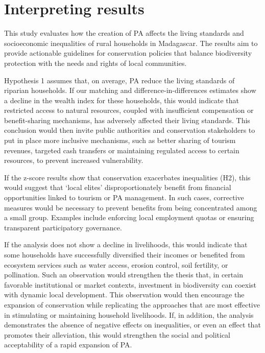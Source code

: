 \documentclass[
]{article}
\begin{document}
\section{Interpreting results}\label{interpreting-results}

This study evaluates how the creation of PA affects the living standards
and socioeconomic inequalities of rural households in Madagascar. The
results aim to provide actionable guidelines for conservation policies
that balance biodiversity protection with the needs and rights of local
communities.

Hypothesis 1 assumes that, on average, PA reduce the living standards of
riparian households. If our matching and difference-in-differences
estimates show a decline in the wealth index for these households, this
would indicate that restricted access to natural resources, coupled with
insufficient compensation or benefit-sharing mechanisms, has adversely
affected their living standards. This conclusion would then invite
public authorities and conservation stakeholders to put in place more
inclusive mechanisms, such as better sharing of tourism revenues,
targeted cash transfers or maintaining regulated access to certain
resources, to prevent increased vulnerability.

If the z-score results show that conservation exacerbates inequalities
(H2), this would suggest that `local elites' disproportionately benefit
from financial opportunities linked to tourism or PA management. In such
cases, corrective measures would be necessary to prevent benefits from
being concentrated among a small group. Examples include enforcing local
employment quotas or ensuring transparent participatory governance.

If the analysis does not show a decline in livelihoods, this would
indicate that some households have successfully diversified their
incomes or benefited from ecosystem services such as water access,
erosion control, soil fertility, or pollination. Such an observation
would strengthen the thesis that, in certain favorable institutional or
market contexts, investment in biodiversity can coexist with dynamic
local development. This observation would then encourage the expansion
of conservation while replicating the approaches that are most effective
in stimulating or maintaining household livelihoods. If, in addition,
the analysis demonstrates the absence of negative effects on
inequalities, or even an effect that promotes their alleviation, this
would strengthen the social and political acceptability of a rapid
expansion of PA.
\end{document}
